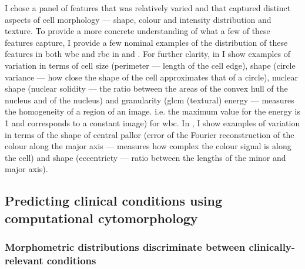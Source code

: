 I chose a panel of features that was relatively varied and that captured distinct aspects of cell morphology --- shape, colour and intensity distribution and texture. To provide a more concrete understanding of what a few of these features capture, I provide a few nominal examples of the distribution of these features in both \ac{wbc} and \ac{rbc} in  and . For further clarity, in  I show examples of variation in terms of cell size (perimeter --- length of the cell edge), shape (circle variance --- how close the shape of the cell approximates that of a circle), nuclear shape (nuclear solidity --- the ratio between the areas of the convex hull of the nucleus and of the nucleus) and granularity (\ac{glcm} (textural) energy --- measures the homogeneity of a region of an image. i.e. the maximum value for the energy is 1 and corresponds to a constant image) for \ac{wbc}. In , I show examples of variation in terms of the shape of central pallor (error of the Fourier reconstruction of the colour along the major axis --- measures how complex the colour signal is along the cell) and shape (eccentricty --- ratio between the lengths of the minor and major axis).

\begin{figure}[!ht]
    \label{fig:feature-examples-wbc}
\end{figure}

\begin{figure}[!ht]
    \label{fig:feature-examples-rbc}
\end{figure}

\subsection{Predicting clinical conditions using computational cytomorphology}

\subsubsection{Morphometric distributions discriminate between clinically-relevant conditions}


